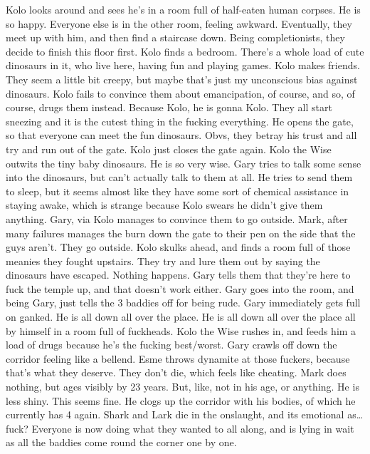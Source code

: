 Kolo looks around and sees he’s in a room full of half-eaten human corpses.\medskip
He is so happy.\medskip
Everyone else is in the other room, feeling awkward.\medskip
Eventually, they meet up with him, and then find a staircase down. Being completionists, they decide to finish this floor first.\medskip
Kolo finds a bedroom. There’s a whole load of cute dinosaurs in it, who live here, having fun and playing games. Kolo makes friends. They seem a little bit creepy, but maybe that’s just my unconscious bias against dinosaurs.\medskip
Kolo fails to convince them about emancipation, of course, and so, of course, drugs them instead. Because Kolo, he is gonna Kolo. They all start sneezing and it is the cutest thing in the fucking everything.\medskip
He opens the gate, so that everyone can meet the fun dinosaurs. Obvs, they betray his trust and all try and run out of the gate.\medskip
Kolo just closes the gate again.\medskip
Kolo the Wise outwits the tiny baby dinosaurs. He is so very wise.\medskip
Gary tries to talk some sense into the dinosaurs, but can’t actually talk to them at all. He tries to send them to sleep, but it seems almost like they have some sort of chemical assistance in staying awake, which is strange because Kolo swears he didn’t give them anything.\medskip
Gary, via Kolo manages to convince them to go outside. Mark, after many failures manages the burn down the gate to their pen on the side that the guys aren’t. They go outside.\medskip
Kolo skulks ahead, and finds a room full of those meanies they fought upstairs. They try and lure them out by saying the dinosaurs have escaped. Nothing happens. Gary tells them that they’re here to fuck the temple up, and that doesn’t work either.\medskip
Gary goes into the room, and being Gary, just tells the 3 baddies off for being rude.\medskip
Gary immediately gets full on ganked.\medskip
He is all down all over the place.\medskip
He is all down all over the place all by himself in a room full of fuckheads.\medskip
Kolo the Wise rushes in, and feeds him a load of drugs because he’s the fucking best/worst.\medskip
Gary crawls off down the corridor feeling like a bellend.\medskip
Esme throws dynamite at those fuckers, because that’s what they deserve.\medskip
They don’t die, which feels like cheating.\medskip
Mark does nothing, but ages visibly by 23 years. But, like, not in his age, or anything. He is less shiny. This seems fine.\medskip
He clogs up the corridor with his bodies, of which he currently has 4 again. Shark and Lark die in the onslaught, and its emotional as… fuck?\medskip
Everyone is now doing what they wanted to all along, and is lying in wait as all the baddies come round the corner one by one.\medskip

